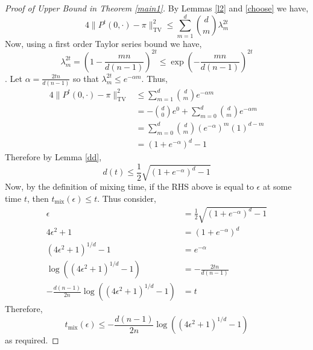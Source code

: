 \documentclass{article}
\theoremstyle{definition}
\theoremstyle{definition}
\theoremstyle{definition}
\theoremstyle{definition}
\theoremstyle{named}
\begin{document}
   \begin{proof}[Proof of Upper Bound in Theorem \ref{main1}]
     By Lemmas \ref{l2} and \ref{choose} we have,
     \[4\lVert P^t(0,\cdot) - \pi\rVert_\text{TV}^2  \leq \sum_{m=1}^d {d \choose m} \lambda_m^{2t} \] 
     Now, using a first order Taylor series bound we have,
     \[\lambda_m^{2t} = \left(1 - \frac{mn}{d(n-1)}\right)^{2t} \leq \exp\left(-\frac{mn}{d(n-1)}\right)^{2t}\].
     Let $\alpha = \frac{2tn}{d(n-1)}$ so that $\lambda_m^{2t} \leq e^{-\alpha m}$. Thus,
     \begin{align*}
     4\lVert P^t(0,\cdot) - \pi\rVert_\text{TV}^2  &\leq \sum_{m=1}^d {d \choose m}e^{-\alpha m}\\
     &= -{d \choose 0}e^{0}+ \sum_{m=0}^d {d \choose m}e^{-\alpha m}\\
     &= \sum_{m=0}^d {d \choose m}\left(e^{-\alpha}\right)^m (1)^{d-m}\\
     &=(1+e^{-\alpha})^d -1
     \end{align*}
     Therefore by Lemma \ref{dd},
     \[d(t) \leq \frac{1}{2}\sqrt{(1+e^{-\alpha})^d-1}\]
     Now, by the definition of mixing time, if the RHS above is equal to $\epsilon$ at some time $t$, then $t_\text{mix}(\epsilon) \leq t$. Thus consider,
     \begin{align*}
      \epsilon &= \frac{1}{2} \sqrt{(1+e^{-\alpha})^d-1}\\
      4\epsilon^2 +1&= (1+e^{-\alpha})^d\\
      (4\epsilon^2 +1)^{1/d}-1&= e^{-\alpha}\\
      \log\left((4\epsilon^2 +1)^{1/d}-1\right)&= -\frac{2tn}{d(n-1)}\\
      -\frac{d(n-1)}{2n}\log\left((4\epsilon^2 +1)^{1/d}-1\right)&= t
     \end{align*}
     Therefore,
   \[t_\text{mix}(\epsilon) \leq -\frac{d(n-1)}{2n}\log\left((4\epsilon^2+1)^{1/d}-1\right)\]
   as required.
   \end{proof}
\end{document}
